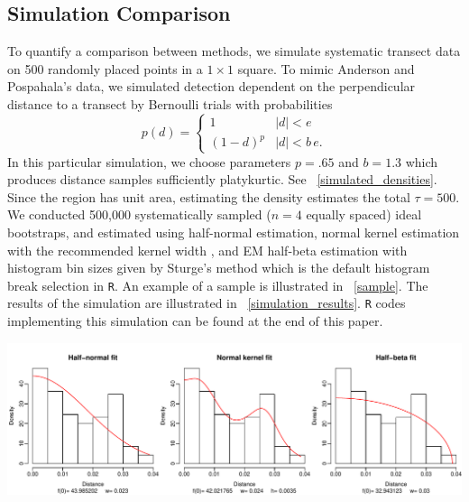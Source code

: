 \documentclass[12pt]{amsart}
\newcommand{\figref}[1]{\figurename~\ref{#1}}
\newenvironment{Figure}{\par\medskip\noindent\minipage{\linewidth}}{\endminipage\par\medskip}
\begin{document}
\begin{multicols}{2}
\section{Simulation Comparison}
To quantify a comparison between methods, we simulate systematic transect data on 500 randomly placed points in a $1\times 1$ square.
To mimic Anderson and Pospahala's data, we simulated detection dependent on the perpendicular distance to a transect by Bernoulli trials with probabilities 
  \begin{equation}
    p(d) = 
    \begin{cases}
      1 & |d| < e\\
      (1-d)^p & |d| < b\, e.
    \end{cases}
    \label{detect}
  \end{equation}
In this particular simulation, we choose parameters $p = .65$ and $b = 1.3$ which produces distance samples sufficiently platykurtic. 
See \figref{simulated_densities}.
Since the region has unit area, estimating the density estimates the total $\tau = 500$. 
We conducted 500,000 systematically sampled ($n=4$ equally spaced) ideal bootstraps, and estimated using half-normal estimation, normal kernel estimation with the recommended kernel width \cite{thompson2012sampling}, and EM half-beta estimation with histogram bin sizes given by Sturge's method which is the default histogram break selection in \texttt R. 
An example of a sample is illustrated in \figref{sample}.
The results of the simulation are illustrated in \figref{simulation_results}.
\texttt R codes implementing this simulation can be found at the end of this paper.
\begin{Figure}
  \includegraphics[width=\linewidth]{../problematic_kernel_fit.pdf}
  \label{simulated_densities}
\end{Figure}


\end{multicols}
\end{document}
